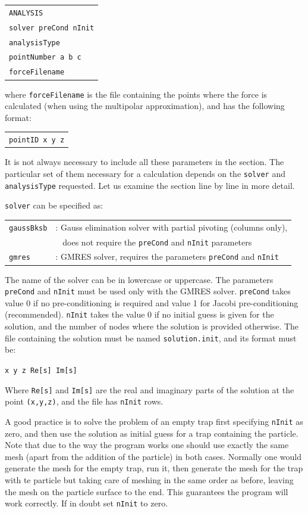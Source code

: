 \documentclass[12pt]{report}
\begin{document}
\begin{tabular}{l}
\texttt{ANALYSIS}\\
\texttt{solver preCond nInit}\\
\texttt{analysisType}\\
\texttt{pointNumber a b c}\\
\texttt{forceFilename}
\end{tabular}

where \verb+forceFilename+ is the file containing the points where the force is calculated (when using the multipolar approximation), and has the following format:

\begin{tabular}{l}
\texttt{pointID x y z}
\end{tabular}

It is not always necessary to include all these parameters in the section. The particular set of them necessary for a calculation depends on the \verb+solver+ and \verb+analysisType+ requested. Let us examine the section line by line in more detail.

\verb+solver+ can be specified as:

\begin{tabular}{ll}
\texttt{gaussBksb}&: Gauss elimination solver with partial pivoting (columns only),\\
  & \verb+ + does not require the \texttt{preCond} and \texttt{nInit} parameters\\
\texttt{gmres}&: GMRES solver, requires the parameters \texttt{preCond} and \texttt{nInit}
\end{tabular}

The name of the solver can be in lowercase or uppercase. The parameters \verb+preCond+ and \verb+nInit+ must be used only with the GMRES solver. \verb+preCond+ takes value 0 if no pre-conditioning is required and value 1 for Jacobi pre-conditioning (recommended). \verb+nInit+ takes the value 0 if no initial guess is given for the solution, and the number of nodes where the solution is provided otherwise. The file containing the solution must be named \verb+solution.init+, and its format must be:

\texttt{x y z Re[s] Im[s]}

Where \verb+Re[s]+ and \verb+Im[s]+ are the real and imaginary parts of the solution at the point \verb+(x,y,z)+, and the file has \verb+nInit+ rows.

A good practice is to solve the problem of an empty trap first specifying \verb+nInit+ as zero, and then use the solution as initial guess for a trap containing the particle. Note that due to the way the program works one should use exactly the same mesh (apart from the addition of the particle) in both cases. Normally one would generate the mesh for the empty trap, run it, then generate the mesh for the trap with te particle but taking care of meshing in the same order as before, leaving the mesh on the particle surface to the end. This guarantees the program will work correctly. If in doubt set \verb+nInit+ to zero.
\end{document}
